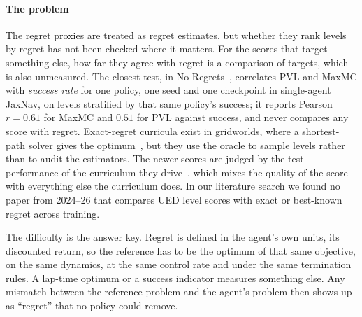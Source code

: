 \paragraph{The problem} The regret proxies are treated as regret estimates, but whether
they rank levels by regret has not been checked where it matters. For the scores that
target something else, how far they agree with regret is a comparison of targets, which
is also unmeasured. The closest test, in No
Regrets~\citep{rutherford2024noregrets}, correlates PVL and MaxMC with \emph{success
rate} for one policy, one seed and one checkpoint in single-agent JaxNav, on levels
stratified by that same policy's success; it reports Pearson $r = 0.61$ for MaxMC and
$0.51$ for PVL against success,
and never compares any score with regret. Exact-regret curricula exist in gridworlds,
where a shortest-path solver gives the optimum~\citep{beukman2024remidi,abdelsadek2025goal},
but they use the oracle to sample levels rather than to audit the estimators. The newer
scores are judged by the test performance of the curriculum they
drive~\citep{mead2026mna,cho2026traced,yuan2026pace}, which mixes the quality of the score
with everything else the curriculum does. In our literature search we found no paper from
2024--26 that compares UED level scores with exact or best-known regret across training.

The difficulty is the answer key. Regret is defined in the agent's own units, its
discounted return, so the reference has to be the optimum of that same objective, on the
same dynamics, at the same control rate and under the same termination rules. A lap-time
optimum or a success indicator measures something else. Any mismatch between the
reference problem and the agent's problem then shows up as ``regret'' that no policy
could remove.

